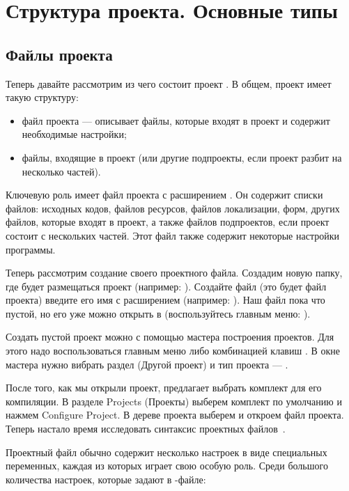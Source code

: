 \chapter[Структура проекта. Основные типы]{\bfseries Структура проекта. Основные типы}
\section[Файлы проекта]{Файлы проекта}
Теперь давайте рассмотрим из чего состоит проект . В общем, проект 
имеет такую структуру:

\begin{itemize}
\item {}файл проекта --- описывает файлы,
которые входят в проект и содержит необходимые настройки;
\item файлы, входящие в проект (или другие подпроекты, если проект разбит на несколько частей).
\end{itemize}
Ключевую роль имеет файл проекта с расширением .
Он содержит списки файлов: исходных кодов, файлов ресурсов, файлов локализации, форм, других файлов,
которые входят в проект, а также файлов подпроектов, если
проект состоит с нескольких частей. Этот файл также содержит некоторые настройки программы.

Теперь рассмотрим создание своего проектного файла. Создадим новую папку, 
где будет размещаться проект (например: ). Создайте файл (это будет файл 
проекта) введите его имя с расширением  (например:
). Наш файл пока что пустой, но его уже можно открыть в  
(воспользуйтесь главным меню: ). 

Создать пустой проект можно с
помощью  мастера построения проектов. Для этого надо воспользоваться главным меню 
 либо комбинацией клавиш . В 
окне мастера нужно вибрать раздел  (Другой проект) и тип 
проекта --- .

После того, как мы открыли проект,  предлагает выбрать комплект
для его компиляции. В разделе Projects (Проекты) выберем
комплект по умолчанию и нажмем Configure
Project. В дереве проекта выберем  и откроем файл проекта. Теперь настало время
исследовать синтаксис проектных файлов~.

Проектный файл обычно содержит несколько настроек в виде специальных переменных, каждая из которых играет
свою особую роль. Среди большого количества настроек, которые задают в -файле:

